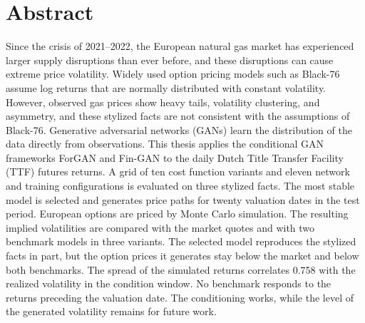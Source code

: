 \section*{Abstract}

Since the crisis of 2021--2022, the European natural gas market has experienced larger supply disruptions than ever before, and these disruptions can cause extreme price volatility. Widely used option pricing models such as Black-76 assume log returns that are normally distributed with constant volatility. However, observed gas prices show heavy tails, volatility clustering, and asymmetry, and these stylized facts are not consistent with the assumptions of Black-76. Generative adversarial networks (GANs) learn the distribution of the data directly from observations. This thesis applies the conditional GAN frameworks ForGAN and Fin-GAN to the daily Dutch Title Transfer Facility (TTF) futures returns. A grid of ten cost function variants and eleven network and training configurations is evaluated on three stylized facts. The most stable model is selected and generates price paths for twenty valuation dates in the test period. European options are priced by Monte Carlo simulation. The resulting implied volatilities are compared with the market quotes and with two benchmark models in three variants. The selected model reproduces the stylized facts in part, but the option prices it generates stay below the market and below both benchmarks. The spread of the simulated returns correlates \num{0.758} with the realized volatility in the condition window. No benchmark responds to the returns preceding the valuation date. The conditioning works, while the level of the generated volatility remains for future work.